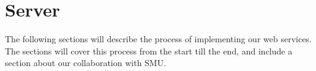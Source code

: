 \section{Server}
The following sections will describe the process of implementing our web services. The sections will cover this process from the start till the end, and include a section about our collaboration with SMU.





